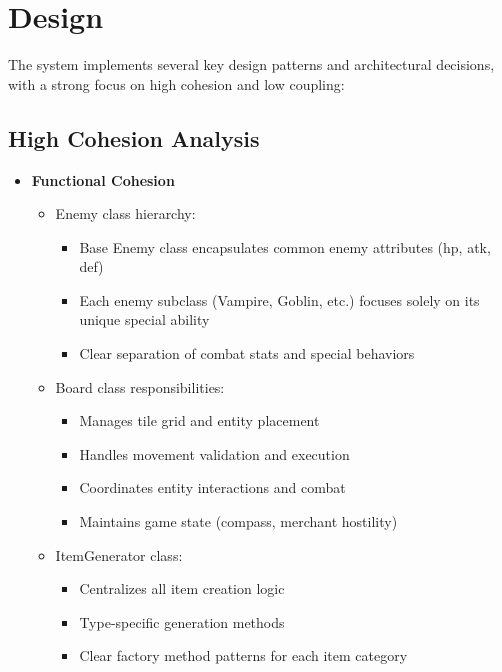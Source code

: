 \documentclass{article}
\begin{document}
\section{Design}
The system implements several key design patterns and architectural decisions, with a strong focus on high cohesion and low coupling:

\subsection{High Cohesion Analysis}
\begin{itemize}
    \item \textbf{Functional Cohesion}
    \begin{itemize}
        \item Enemy class hierarchy:
        \begin{itemize}
            \item Base Enemy class encapsulates common enemy attributes (hp, atk, def)
            \item Each enemy subclass (Vampire, Goblin, etc.) focuses solely on its unique special ability
            \item Clear separation of combat stats and special behaviors
        \end{itemize}
        \item Board class responsibilities:
        \begin{itemize}
            \item Manages tile grid and entity placement
            \item Handles movement validation and execution
            \item Coordinates entity interactions and combat
            \item Maintains game state (compass, merchant hostility)
        \end{itemize}
        \item ItemGenerator class:
        \begin{itemize}
            \item Centralizes all item creation logic
            \item Type-specific generation methods
            \item Clear factory method patterns for each item category
        \end{itemize}
    \end{itemize}


\end{itemize}
\end{document}
